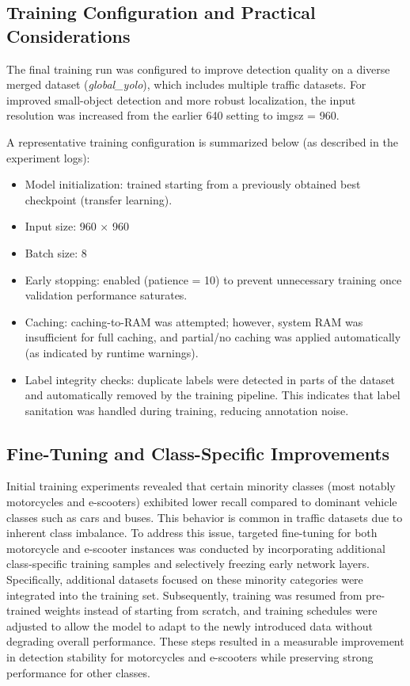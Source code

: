 \documentclass[12pt,a4paper]{report}
\begin{document}
\subsection[Training Configuration]{Training Configuration and Practical Considerations}

The final training run was configured to improve detection quality on a diverse merged dataset (\textit{global\_yolo}), which includes multiple traffic datasets. For improved small-object detection and more robust localization, the input resolution was increased from the earlier 640 setting to imgsz = 960.

A representative training configuration is summarized below (as described in the experiment logs):

\begin{itemize}
    \item Model initialization: trained starting from a previously obtained best checkpoint (transfer learning).
    \item Input size: 960 × 960
    \item Batch size: 8
    \item Early stopping: enabled (patience = 10) to prevent unnecessary training once validation performance saturates.
    \item Caching: caching-to-RAM was attempted; however, system RAM was insufficient for full caching, and partial/no caching was applied automatically (as indicated by runtime warnings).
    \item Label integrity checks: duplicate labels were detected in parts of the dataset and automatically removed by the training pipeline. This indicates that label sanitation was handled during training, reducing annotation noise.
\end{itemize}

 
\subsection{Fine-Tuning and Class-Specific Improvements}
Initial training experiments revealed that certain minority classes (most notably motorcycles and e-scooters) exhibited lower recall compared to dominant vehicle classes such as cars and buses. This behavior is common in traffic datasets due to inherent class imbalance. To address this issue, targeted fine-tuning for both motorcycle and e-scooter instances was conducted by incorporating additional class-specific training samples and selectively freezing early network layers. Specifically, additional datasets focused on these minority categories were integrated into the training set. Subsequently, training was resumed from pre-trained weights instead of starting from scratch, and training schedules were adjusted to allow the model to adapt to the newly introduced data without degrading overall performance. These steps resulted in a measurable improvement in detection stability for motorcycles and e-scooters while preserving strong performance for other classes.
\end{document}
